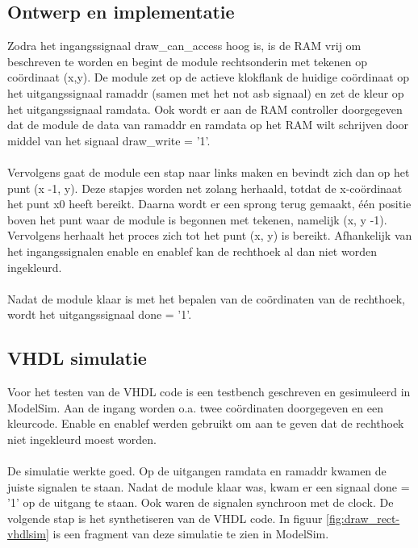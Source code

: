 \documentclass{scrartcl} %
\begin{document}
\subsection{Ontwerp en implementatie}
Zodra het ingangssignaal draw\_can\_access hoog is, is de RAM vrij om beschreven te worden en begint de module rechtsonderin met tekenen op coördinaat (x,y). De module zet op de actieve klokflank de huidige coördinaat op het uitgangssignaal ramaddr (samen met het not asb signaal) en zet de kleur op het uitgangssignaal ramdata. Ook wordt er aan de RAM controller doorgegeven dat de module de data van ramaddr en ramdata op het RAM wilt schrijven door middel van het signaal draw\_write = '1'.
\\\\
Vervolgens gaat de module een stap naar links maken en bevindt zich dan op het punt (x -1, y). Deze stapjes worden net zolang herhaald, totdat de x-coördinaat het punt x0 heeft bereikt. Daarna wordt er een sprong terug gemaakt, één positie boven het punt waar de module is begonnen met tekenen, namelijk (x, y -1). Vervolgens herhaalt het proces zich tot het punt (x, y) is bereikt. Afhankelijk van het ingangssignalen enable en enablef kan de rechthoek al dan niet worden ingekleurd.
\\\\
Nadat de module klaar is met het bepalen van de coördinaten van de rechthoek, wordt het uitgangssignaal done = '1'.

\subsection{VHDL simulatie}
Voor het testen van de VHDL code is een testbench geschreven en gesimuleerd in ModelSim. Aan de ingang worden o.a. twee coördinaten doorgegeven en een kleurcode. Enable en enablef werden gebruikt om aan te geven dat de rechthoek niet ingekleurd moest worden.
\\\\
De simulatie werkte goed. Op de uitgangen ramdata en ramaddr kwamen de juiste signalen te staan. Nadat de module klaar was, kwam er een signaal done = '1' op de uitgang te staan. Ook waren de signalen synchroon met de clock. De volgende stap is het synthetiseren van de VHDL code. In figuur \ref{fig:draw_rect-vhdlsim} is een fragment van deze simulatie te zien in ModelSim.
\\\\
\end{document}

